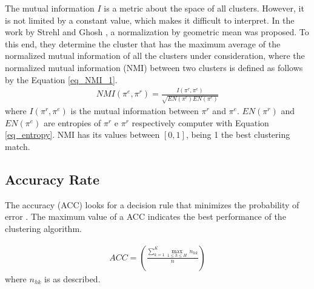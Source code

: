 The mutual information $I$ is a metric about the space of all clusters. However, it is not limited by a constant value, which makes it difficult to interpret. In the work by Strehl and Ghosh \cite{Strehl2002}, a normalization by geometric mean was proposed. To this end, they determine the cluster that has the maximum average of the normalized mutual information of all the clusters under consideration, where the normalized mutual information (NMI) between two clusters is defined as follows by the Equation \ref{eq_NMI_1}.
\begin{eqnarray}
\label{eq_NMI_1}
NMI(\pi^e,\pi^r)=\frac{I(\pi^r,\pi^e)}{\sqrt{EN(\pi^r)EN(\pi^e)}}
\end{eqnarray}
\noindent
where $I(\pi^r,\pi^e)$ is the mutual information between $\pi^r$ and $\pi^e$. $EN(\pi^r)$ and $EN(\pi^e)$ are entropies of $\pi^r$ e $\pi^r$ respectively computer with Equation \ref{eq_entropy}. NMI has its values between $[0,1]$, being 1 the best clustering match.





\subsection{Accuracy Rate}
The accuracy (ACC) looks for a decision rule that minimizes the probability of error \cite{Breiman1984}. The maximum value of a ACC indicates the best performance of the clustering algorithm.

\begin{eqnarray}
\label{eq_ERC}
ACC = \left(\frac{\sum_{k=1}^K \max_{1 \leq h \leq H} \,n_{hk}}{n}\right)
\end{eqnarray}
\noindent
where $n_{hk}$ is as described.


